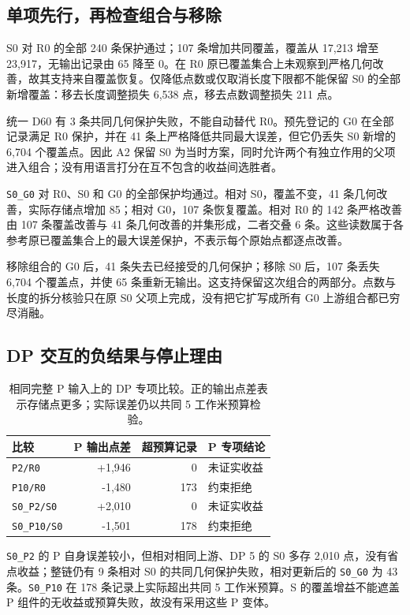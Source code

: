 \subsection{单项先行，再检查组合与移除}
S0 对 R0 的全部 240 条保护通过；107 条增加共同覆盖，覆盖从 17,213 增至 23,917，无输出记录由 65 降至 0。在 R0 原已覆盖集合上未观察到严格几何改善，故其支持来自覆盖恢复。仅降低点数或仅取消长度下限都不能保留 S0 的全部新增覆盖：移去长度调整损失 6,538 点，移去点数调整损失 211 点。

统一 D60 有 3 条共同几何保护失败，不能自动替代 R0。预先登记的 G0 在全部记录满足 R0 保护，并在 41 条上严格降低共同最大误差，但它仍丢失 S0 新增的 6,704 个覆盖点。因此 A2 保留 S0 为当时方案，同时允许两个有独立作用的父项进入组合；没有用语言打分在互不包含的收益间选胜者。

\texttt{S0\_G0} 对 R0、S0 和 G0 的全部保护均通过。相对 S0，覆盖不变，41 条几何改善，实际存储点增加 85；相对 G0，107 条恢复覆盖。相对 R0 的 142 条严格改善由 107 条覆盖改善与 41 条几何改善的并集形成，二者交叠 6 条。这些读数属于各参考原已覆盖集合上的最大误差保护，不表示每个原始点都逐点改善。

移除组合的 G0 后，41 条失去已经接受的几何保护；移除 S0 后，107 条丢失 6,704 个覆盖点，并使 65 条重新无输出。这支持保留这次组合的两部分。点数与长度的拆分核验只在原 S0 父项上完成，没有把它扩写成所有 G0 上游组合都已穷尽消融。

\subsection{DP 交互的负结果与停止理由}
\begin{table}[H]\centering\small
\caption{相同完整 P 输入上的 DP 专项比较。正的输出点差表示存储点更多；实际误差仍以共同 5 工作米预算检验。}
\begin{tabularx}{\linewidth}{@{}lrrY@{}}\toprule 比较 & P 输出点差 & 超预算记录 & P 专项结论 \\ \midrule
\texttt{P2/R0} & +1,946 & 0 & 未证实收益 \\
\texttt{P10/R0} & -1,480 & 173 & 约束拒绝 \\
\texttt{S0\_P2/S0} & +2,010 & 0 & 未证实收益 \\
\texttt{S0\_P10/S0} & -1,501 & 178 & 约束拒绝 \\
\bottomrule\end{tabularx}\end{table}
\texttt{S0\_P2} 的 P 自身误差较小，但相对相同上游、DP 5 的 S0 多存 2,010 点，没有省点收益；整链仍有 9 条相对 S0 的共同几何保护失败，相对更新后的 \texttt{S0\_G0} 为 43 条。\texttt{S0\_P10} 在 178 条记录上实际超出共同 5 工作米预算。S 的覆盖增益不能遮盖 P 组件的无收益或预算失败，故没有采用这些 P 变体。

